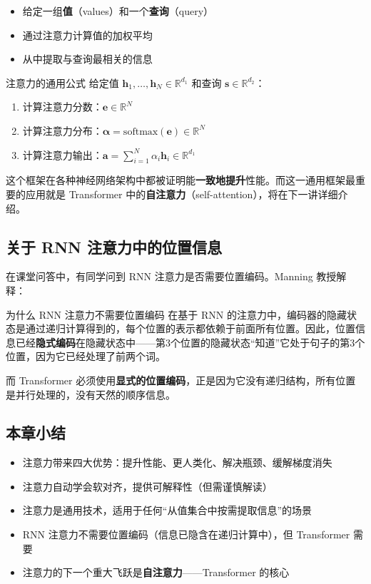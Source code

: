 \documentclass[a4paper]{article}
\begin{document}
\begin{itemize}
    \item 给定一组\textbf{值}（values）和一个\textbf{查询}（query）
    \item 通过注意力计算值的加权平均
    \item 从中提取与查询最相关的信息
\end{itemize}

\begin{importantbox}{注意力的通用公式}
给定值 $\mathbf{h}_1, \ldots, \mathbf{h}_N \in \mathbb{R}^{d_1}$ 和查询 $\mathbf{s} \in \mathbb{R}^{d_2}$：
\begin{enumerate}
    \item 计算注意力分数：$\mathbf{e} \in \mathbb{R}^N$
    \item 计算注意力分布：$\boldsymbol{\alpha} = \mathrm{softmax}(\mathbf{e}) \in \mathbb{R}^N$
    \item 计算注意力输出：$\mathbf{a} = \sum_{i=1}^N \alpha_i \mathbf{h}_i \in \mathbb{R}^{d_1}$
\end{enumerate}
这个框架在各种神经网络架构中都被证明能\textbf{一致地提升}性能。而这一通用框架最重要的应用就是 Transformer 中的\textbf{自注意力}（self-attention），将在下一讲详细介绍。
\end{importantbox}

\subsection{关于 RNN 注意力中的位置信息}

在课堂问答中，有同学问到 RNN 注意力是否需要位置编码。Manning 教授解释：

\begin{knowledgebox}{为什么 RNN 注意力不需要位置编码}
在基于 RNN 的注意力中，编码器的隐藏状态是通过递归计算得到的，每个位置的表示都依赖于前面所有位置。因此，位置信息已经\textbf{隐式编码}在隐藏状态中——第3个位置的隐藏状态``知道''它处于句子的第3个位置，因为它已经处理了前两个词。

而 Transformer 必须使用\textbf{显式的位置编码}，正是因为它没有递归结构，所有位置是并行处理的，没有天然的顺序信息。
\end{knowledgebox}

\subsection{本章小结}

\begin{itemize}
    \item 注意力带来四大优势：提升性能、更人类化、解决瓶颈、缓解梯度消失
    \item 注意力自动学会软对齐，提供可解释性（但需谨慎解读）
    \item 注意力是通用技术，适用于任何``从值集合中按需提取信息''的场景
    \item RNN 注意力不需要位置编码（信息已隐含在递归计算中），但 Transformer 需要
    \item 注意力的下一个重大飞跃是\textbf{自注意力}——Transformer 的核心
\end{itemize}
\end{document}
